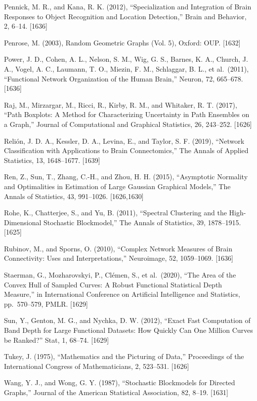 \documentclass[
  10
]{article}
\begin{document}
Pennick, M. R., and Kana, R. K. (2012), ``Specialization and Integration
of Brain Responses to Object Recognition and Location Detection,'' Brain
and Behavior, 2, 6--14. {[}1636{]}

Penrose, M. (2003), Random Geometric Graphs (Vol. 5), Oxford: OUP.
{[}1632{]}

Power, J. D., Cohen, A. L., Nelson, S. M., Wig, G. S., Barnes, K. A.,
Church, J. A., Vogel, A. C., Laumann, T. O., Miezin, F. M., Schlaggar,
B. L., et al.~(2011), ``Functional Network Organization of the Human
Brain,'' Neuron, 72, 665--678. {[}1636{]}

Raj, M., Mirzargar, M., Ricci, R., Kirby, R. M., and Whitaker, R. T.
(2017), ``Path Boxplots: A Method for Characterizing Uncertainty in Path
Ensembles on a Graph,'' Journal of Computational and Graphical
Statistics, 26, 243--252. {[}1626{]}

Relión, J. D. A., Kessler, D. A., Levina, E., and Taylor, S. F. (2019),
``Network Classification with Applications to Brain Connectomics,'' The
Annals of Applied Statistics, 13, 1648--1677. {[}1639{]}

Ren, Z., Sun, T., Zhang, C.-H., and Zhou, H. H. (2015), ``Asymptotic
Normality and Optimalities in Estimation of Large Gaussian Graphical
Models,'' The Annals of Statistics, 43, 991--1026. {[}1626,1630{]}

Rohe, K., Chatterjee, S., and Yu, B. (2011), ``Spectral Clustering and
the High-Dimensional Stochastic Blockmodel,'' The Annals of Statistics,
39, 1878--1915. {[}1625{]}

Rubinov, M., and Sporns, O. (2010), ``Complex Network Measures of Brain
Connectivity: Uses and Interpretations,'' Neuroimage, 52, 1059--1069.
{[}1636{]}

Staerman, G., Mozharovskyi, P., Clémen, S., et al.~(2020), ``The Area of
the Convex Hull of Sampled Curves: A Robust Functional Statistical Depth
Measure,'' in International Conference on Artificial Intelligence and
Statistics, pp.~570--579, PMLR. {[}1629{]}

Sun, Y., Genton, M. G., and Nychka, D. W. (2012), ``Exact Fast
Computation of Band Depth for Large Functional Datasets: How Quickly Can
One Million Curves be Ranked?'' Stat, 1, 68--74. {[}1629{]}

Tukey, J. (1975), ``Mathematics and the Picturing of Data,'' Proceedings
of the International Congress of Mathematicians, 2, 523--531. {[}1626{]}

Wang, Y. J., and Wong, G. Y. (1987), ``Stochastic Blockmodels for
Directed Graphs,'' Journal of the American Statistical Association, 82,
8--19. {[}1631{]}
\end{document}
